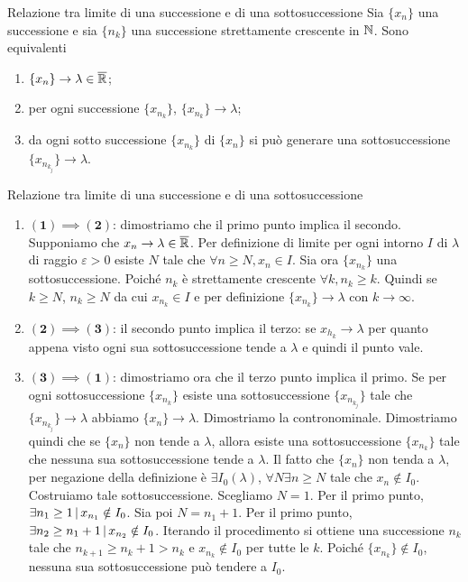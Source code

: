 \documentclass[a4paper]{article}
\begin{document}
\begin{snippettheorem}{Relazione tra limite di una successione e di una sottosuccessione}
    Sia \(\{x_n\}\) una successione e sia \(\{n_k\}\) una successione strettamente crescente
    in \(\mathbb{N}\). Sono equivalenti
    \begin{enumerate}
        \item \(\{x_n\} \to \lambda \in \overline{\mathbb{R}}\);
        \item per ogni successione \(\{x_{n_k}\}\), \(\{x_{n_k}\} \to \lambda\);
        \item da ogni sotto successione \(\{x_{n_k}\}\) di \(\{x_n\}\)
        si può generare una sottosuccessione \(\{x_{n_{k_j}}\} \to \lambda\).
    \end{enumerate}
\end{snippettheorem}

\begin{snippetproof}{Relazione tra limite di una successione e di una sottosuccessione}
    \begin{enumerate}
        \item \(\mathbf{(1) \implies (2)}\): dimostriamo che il primo punto implica il secondo. Supponiamo che \(x_n \to \lambda \in \overline{\mathbb{R}}\).
        Per definizione di limite per ogni intorno \(I\) di \(\lambda\) di raggio \(\varepsilon >0\)
        esiste \(N\) tale che \(\forall n \geq N, x_n \in I\).
        Sia ora \(\{x_{n_k}\}\) una sottosuccessione. Poiché \(n_k\) è strettamente crescente
        \(\forall k, n_k \geq k\). Quindi se \(k \geq N\), \(n_k \geq N\) da cui \(x_{n_k} \in I\)
        e per definizione \(\{x_{n_k}\} \to \lambda\) con \(k \to \infty\).
        \item \(\mathbf{(2) \implies (3)}\): il secondo punto implica il terzo: se \(x_{h_k} \to \lambda\) per quanto appena visto ogni sua sottosuccessione
        tende a \(\lambda\) e quindi il punto vale.
        \item \(\mathbf{(3) \implies (1)}\): dimostriamo ora che il terzo punto implica il primo.
        Se per ogni sottosuccessione \(\{x_{n_k}\}\) esiste una sottosuccessione
        \(\{x_{n_{k_j}}\}\) tale che \(\{x_{n_{k_j}}\} \to \lambda\) abbiamo \(\{x_n\} \to \lambda\).
        Dimostriamo la contronominale.
        Dimostriamo quindi che se \(\{x_n\}\) non tende a \(\lambda\), allora esiste una sottosuccessione
        \(\{x_{n_k}\}\) tale che nessuna sua sottosuccessione tende a \(\lambda\).
        Il fatto che \(\{x_n\}\) non tenda a \(\lambda\), per negazione della definizione è
        \(\exists I_0(\lambda)\), \(\forall N \exists n \geq N\) tale che \(x_n \notin I_0\).
        Costruiamo tale sottosuccessione. Scegliamo \(N=1\).
        Per il primo punto, \(\exists n_1 \geq 1 \,|\, x_{n_1} \notin I_0\).
        Sia poi \(N=n_1 + 1\). Per il primo punto, \(\exists n_2 \geq n_1 + 1 \,|\, x_{n_2} \notin I_0\).
        Iterando il procedimento si ottiene una successione \(n_k\) tale che
        \(n_{k+1} \geq n_k + 1 > n_k\) e \(x_{n_k} \notin I_0\) per tutte le \(k\).
        Poiché \(\{x_{n_k}\} \notin I_0\), nessuna sua sottosuccessione può tendere a \(I_0\).
    \end{enumerate}
\end{snippetproof}
\end{document}
